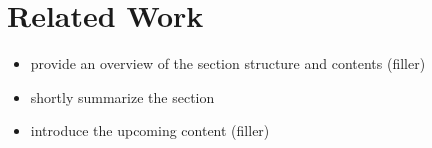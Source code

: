 \section{Related Work}

\begin{itemize}
  \item provide an overview of the section structure and contents (filler)
\end{itemize}







\begin{itemize}
  \item shortly summarize the section
  \item introduce the upcoming content (filler)
\end{itemize}
